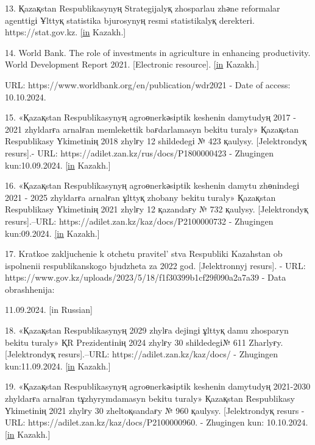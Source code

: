 {{13. Қazaқstan Respublikasynyң Strategijalyқ zhosparlau zhәne reformalar
agenttіgі Ұlttyқ statistika bjurosynyң resmi statistikalyқ derekterі.
https://stat.gov.kz.
\href{https://kaz.zakon.kz/kogam-tynysy/6048484.\%20\%20\%20\%5bin}{{[}in}
Kazakh.{]}

14. World Bank. The role of investments in agriculture in enhancing
productivity. World Development Report 2021. {[}Electronic resource{]}.
\href{https://kaz.zakon.kz/kogam-tynysy/6048484.\%20\%20\%20\%5bin}{{[}in}
Kazakh.{]}

URL: https://www.worldbank.org/en/publication/wdr2021 - Date of access:
10.10.2024.

15. «Қazaқstan Respublikasynyң agroөnerkәsіptіk keshenіn damytudyң 2017
- 2021 zhyldarғa arnalғan memlekettіk baғdarlamasyn bekіtu turaly»
Қazaқstan Respublikasy Үkіmetіnің 2018 zhylғy 12 shіldedegі № 423
қaulysy. {[}Jelektrondyқ resurs{]}.- URL:
https://adilet.zan.kz/rus/docs/P1800000423 - Zhugingen kun:10.09.2024.
\href{https://kaz.zakon.kz/kogam-tynysy/6048484.\%20\%20\%20\%5bin}{{[}in}
Kazakh.{]}

16. «Қazaқstan Respublikasynyң agroөnerkәsіptіk keshenіn damytu
zhөnіndegі 2021 - 2025 zhyldarғa arnalғan ұlttyқ zhobany bekіtu turaly»
Қazaқstan Respublikasy Үkіmetіnің 2021 zhylғy 12 қazandaғy № 732
қaulysy. {[}Jelektrondyқ resurs{]}.--URL:
https://adilet.zan.kz/kaz/docs/P2100000732 - Zhugingen kun:09.2024.
\href{https://kaz.zakon.kz/kogam-tynysy/6048484.\%20\%20\%20\%5bin}{{[}in}
Kazakh.{]}

17. Kratkoe zakljuchenie k otchetu pravitel' stva
Respubliki Kazahstan ob ispolnenii respublikanskogo bjudzheta za 2022
god. {[}Jelektronnyj resurs{]}. - URL:
https://www.gov.kz/uploads/2023/5/18/f1f30399b1cf29f090a2a7a39 - Data
obrashhenija:

11.09.2024. {[}in Russian{]}

18. «Қazaқstan Respublikasynyң 2029 zhylғa dejіngі ұlttyқ damu zhosparyn
bekіtu turaly» ҚR Prezidentіnің 2024 zhylғy 30 shіldedegі№ 611 Zharlyғy.
{[}Jelektrondyқ resurs{]}.--URL: https://adilet.zan.kz/kaz/docs/ -
Zhugingen kun:11.09.2024.
\href{https://kaz.zakon.kz/kogam-tynysy/6048484.\%20\%20\%20\%5bin}{{[}in}
Kazakh.{]}

19. «Қazaқstan Respublikasynyң agroөnerkәsіptіk keshenіn damytudyң
2021-2030 zhyldarғa arnalғan tұzhyrymdamasyn bekіtu turaly» Қazaқstan
Respublikasy Үkіmetіnің 2021 zhylғy 30 zheltoқsandaғy № 960 қaulysy.
{[}Jelektrondyқ resurs - URL:
https://adilet.zan.kz/kaz/docs/P2100000960. - Zhugingen kun: 10.10.2024.
\href{https://kaz.zakon.kz/kogam-tynysy/6048484.\%20\%20\%20\%5bin}{{[}in}
Kazakh.{]}

}}
